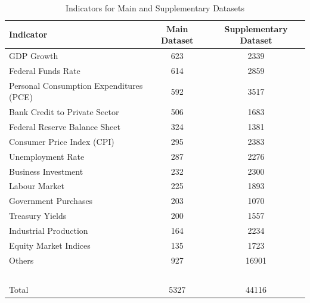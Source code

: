 \begin{table}[htbp]
\centering
\begin{tabular}{lcc}
\toprule
\textbf{Indicator} & \textbf{Main Dataset} & \textbf{Supplementary Dataset} \\
\hline
GDP Growth & 623 & 2339 \\
Federal Funds Rate & 614 & 2859 \\
Personal Consumption Expenditures (PCE) & 592 & 3517 \\
Bank Credit to Private Sector & 506 & 1683 \\
Federal Reserve Balance Sheet & 324 & 1381 \\
Consumer Price Index (CPI) & 295 & 2383 \\
Unemployment Rate & 287 & 2276 \\
Business Investment & 232 & 2300 \\
Labour Market & 225 & 1893 \\
Government Purchases & 203 & 1070 \\
Treasury Yields & 200 & 1557 \\
Industrial Production & 164 & 2234 \\
Equity Market Indices & 135 & 1723 \\
Others & 927 & 16901 \\
\midrule
~\\
Total & 5327 & 44116 \\
\bottomrule
\end{tabular}
\caption{Indicators for Main and Supplementary Datasets}
\label{tab:ch2:indicator_count}
\end{table}




